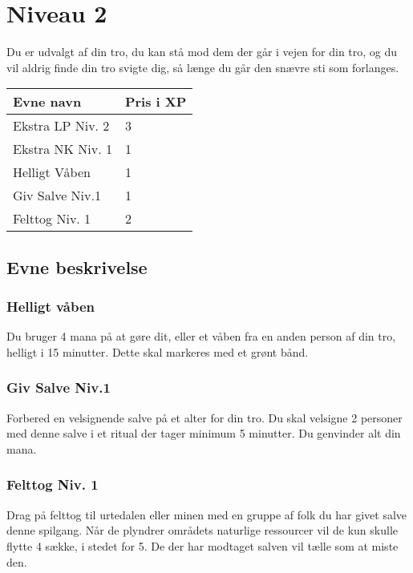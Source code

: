 \chapter{Niveau 2}
Du er udvalgt af din tro, du kan stå mod dem der går i vejen for din tro, og du vil aldrig finde din tro svigte dig, så længe du går den snævre sti som forlanges.

\begin{table}[H]
    \centering
    \begin{tabular}{|p{}|p{}|}
    \rowcolor{cerulean!80}\hline
    Evne navn & Pris i XP \\\hline
        Ekstra LP Niv. 2& 3\\\hline
        Ekstra NK Niv. 1& 1\\\hline
        Helligt Våben & 1\\\hline
        Giv Salve Niv.1 & 1\\\hline
        Felttog Niv. 1& 2\\\hline
    \end{tabular}
\end{table}
\section{Evne beskrivelse}



\subsection{Helligt våben}
Du bruger 4 mana på at gøre dit, eller et våben fra en anden person af din tro, helligt i 15 minutter. Dette skal markeres med et grønt bånd.

\subsection{Giv Salve Niv.1}
Forbered en velsignende salve på et alter for din tro. Du skal velsigne 2 personer med denne salve i et ritual der tager minimum 5 minutter. Du genvinder alt din mana.

\subsection{Felttog Niv. 1}
Drag på felttog til urtedalen eller minen med en gruppe af folk du har givet salve denne spilgang. Når de plyndrer områdets naturlige ressourcer vil de kun skulle flytte 4 sække, i stedet for 5. De der har modtaget salven vil tælle som at miste den.